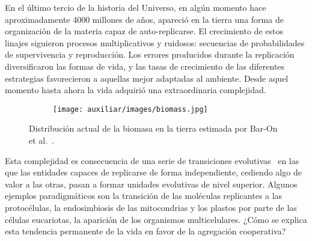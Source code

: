 \documentclass[a4paper,10pt]{article}
\begin{document}
En el último tercio de la historia del Universo, en algún momento hace aproximadamente 4000 millones de años, apareció en la tierra una forma de organización de la materia capaz de auto-replicarse.
El crecimiento de estos linajes siguieron procesos multiplicativos y ruidosos: secuencias de probabilidades de supervivencia y reproducción.
Los errores producidos durante la replicación diversificaron las formas de vida, y las tasas de crecimiento de las diferentes estrategias favorecieron a aquellas mejor adaptadas al ambiente.
Desde aquel momento hasta ahora la vida adquirió una extraordinaria complejidad.
%
\begin{figure}[H]
    \centering
    \begin{subfigure}[b]{0.65\textwidth}
    \texttt{[image: auxiliar/images/biomass.jpg]}
    \end{subfigure}
    \caption{
	Distribución actual de la biomasa en la tierra estimada por Bar-On et al.~\cite{barOn2018-biomass}.
    }
    \label{fig:cpr_individual}
\end{figure}
%
Esta complejidad es consecuencia de una serie de transiciones evolutivas~\cite{maynardSmith1995-majorTransitions} en las que las entidades capaces de replicarse de forma independiente, cediendo algo de valor a las otras, pasan a formar unidades evolutivas de nivel superior.
Algunos ejemplos paradigmáticos son la transición de las moléculas replicantes a las protocélulas, la endosimbiosis de las mitocondrias y los plastos por parte de las células eucariotas, la aparición de los organismos multicelulares.
¿Cómo se explica esta tendencia permanente de la vida en favor de la agregación cooperativa?
\end{document}
